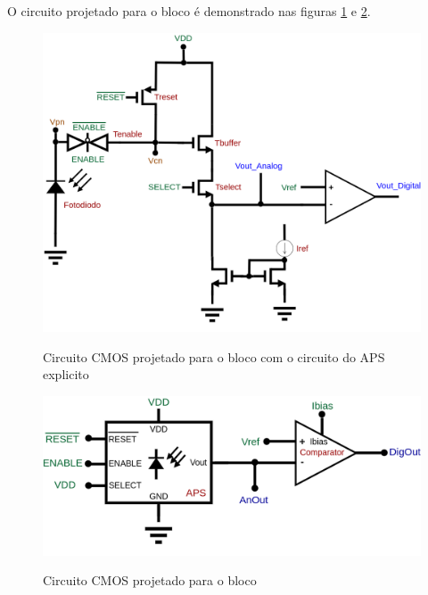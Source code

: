 O circuito projetado para o bloco \'e demonstrado nas figuras \ref{repblocoAPS} e \ref{repblocoAPS2}.

\begin{figure}[!h]
 \centering
    \centering
    \caption{Circuito CMOS projetado para o bloco \NomeBloco com o circuito do APS explicito} 
    \includegraphics[scale=0.3]{Circuitos/APS_digitalized_rep.png}
    \label{repblocoAPS}
\end{figure}

\begin{figure}[!h]
 \centering
    \centering
    \caption{Circuito CMOS projetado para o bloco \NomeBloco} 
    \includegraphics[scale=0.3]{Circuitos/APS_digitalized.png}
    \label{repblocoAPS2}
\end{figure}

